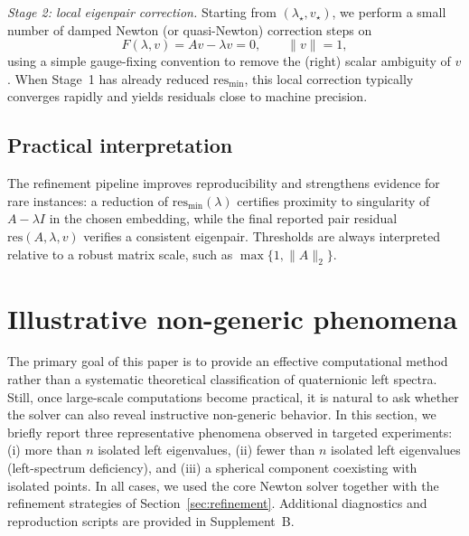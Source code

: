\documentclass[preprint,12pt]{elsarticle}  %
\theoremstyle{definition}
\theoremstyle{definition}
\theoremstyle{definition}
\theoremstyle{definition}
\theoremstyle{definition}
\theoremstyle{remark}
\theoremstyle{remark}
\theoremstyle{remark}
\begin{document}
\noindent\emph{Stage 2: local eigenpair correction.}
Starting from $(\lambda_\star,v_\star)$, we perform a small number of damped Newton (or quasi-Newton) correction steps on
\[
F(\lambda,v)=Av-\lambda v=0,\qquad \|v\|=1,
\]
using a simple gauge-fixing convention to remove the (right) scalar ambiguity of $v$. When Stage~1 has already reduced
$\mathrm{res}_{\min}$, this local correction typically converges rapidly and yields residuals close to machine precision.

\subsection{Practical interpretation}
The refinement pipeline improves reproducibility and strengthens evidence for rare instances: a reduction of $\mathrm{res}_{\min}(\lambda)$
certifies proximity to singularity of $A-\lambda I$ in the chosen embedding, while the final reported pair residual
$\mathrm{res}(A,\lambda,v)$ verifies a consistent eigenpair. Thresholds are always interpreted relative to a robust matrix scale, such as
$\max\{1,\|A\|_2\}$.



\section{Illustrative non-generic phenomena}
\label{sec:illustrative_nongeneric}

The primary goal of this paper is to provide an effective computational method rather than a systematic theoretical classification of quaternionic left spectra.
Still, once large-scale computations become practical, it is natural to ask whether the solver can also reveal instructive non-generic behavior.
In this section, we briefly report three representative phenomena observed in targeted experiments: (i) more than $n$ isolated left eigenvalues,
(ii) fewer than $n$ isolated left eigenvalues (left-spectrum deficiency), and (iii) a spherical component coexisting with isolated points.
In all cases, we used the core Newton solver together with the refinement strategies of Section~\ref{sec:refinement}.
Additional diagnostics and reproduction scripts are provided in Supplement~B.
\end{document}
